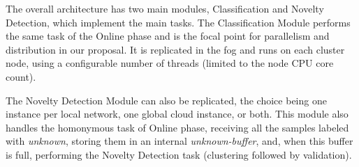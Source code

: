 


The overall \mfog architecture has two main modules, Classification and Novelty
Detection, which implement the \minas main tasks.
The Classification Module performs the same task of the \minas Online phase and
is the focal point for parallelism and distribution in our proposal.
It is replicated in the fog and runs on each cluster node, using a configurable
number of threads (limited to the node CPU core count).

The Novelty Detection Module can also be replicated,
the choice being one instance per local network, one global cloud instance,
or both.
This module also handles the homonymous task of \minas Online phase, receiving
all the samples labeled with \emph{unknown}, storing them in an internal
\emph{unknown-buffer}, and, when this buffer is full, performing the \minas
Novelty Detection task (clustering followed by validation).


